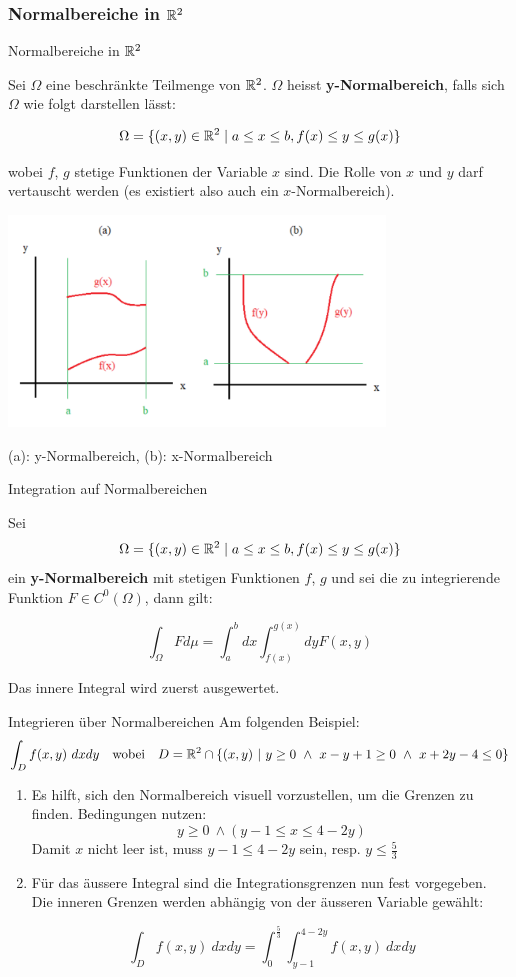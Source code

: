 \subsubsection{Normalbereiche in $\mathbb{R}^2$}

\begin{Definition}{Normalbereiche in $\mathbb{R}^2$}{}

Sei $\Omega$ eine beschränkte Teilmenge von $\mathbb{R}^2$. $\Omega$ heisst \textbf{y-Normalbereich}, falls sich $\Omega$ wie folgt darstellen lässt:

\[
    \Omega = \{(x, y) \in \mathbb{R}^2 \mid a \leq x \leq b, f(x) \leq y \leq g(x)\}
\]

wobei $f$, $g$ stetige Funktionen der Variable $x$ sind. Die Rolle von $x$ und $y$ darf vertauscht werden (es existiert also auch ein $x$-Normalbereich).

\includegraphics[width=10cm]{images/normalbereich}

(a): y-Normalbereich, (b): x-Normalbereich

\end{Definition}
\begin{Satz}{Integration auf Normalbereichen}{}

Sei \[\Omega = \{(x, y) \in \mathbb{R}^2 \mid a \leq x \leq b, f(x) \leq y \leq g(x)\}\] ein \textbf{y-Normalbereich} mit stetigen Funktionen $f$, $g$ und sei die zu integrierende Funktion $F \in C^0(\Omega)$, dann gilt:

\[
    \int_{\Omega} F d\mu = \int_a^b dx \int_{f(x)}^{g(x)} dy F(x, y)
\]

Das innere Integral wird zuerst ausgewertet.
\end{Satz}

\begin{Rezept}{Integrieren über Normalbereichen}{}
Am folgenden Beispiel:
\[ \int_D f(x, y) ~ dx dy ~~ \text{ wobei } ~~ D = \mathbb{R}^2 \cap \{(x, y) ~ | ~ y \geq 0 ~ \wedge ~ x-y+1\geq 0 ~ \wedge ~ x+2y-4 \leq 0\}\]
\begin{enumerate}
\item {
Es hilft, sich den Normalbereich visuell vorzustellen, um die Grenzen
zu finden. Bedingungen nutzen:
\[ y \geq 0 ~ \wedge (y-1 \leq x \leq 4-2y) \]
Damit $x$ nicht leer ist, muss $y-1 \leq 4-2y$ sein, resp. $y \leq \frac{5}{3}$ 
}
\item {
Für das äussere Integral sind die Integrationsgrenzen nun fest vorgegeben. Die inneren Grenzen
werden abhängig von der äusseren Variable gewählt:

\[ \int_D f(x,y) ~ dx dy = \int_0^{\frac{5}{3}} \int_{y-1}^{4-2y} f(x,y) ~ dx dy \]

}
\end{enumerate}
\end{Rezept}

